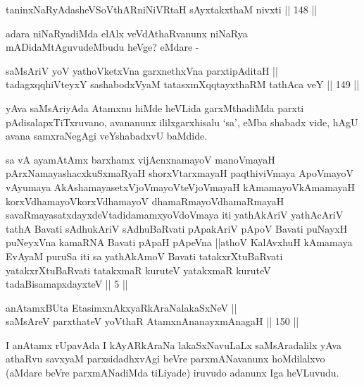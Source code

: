 \begin{shl}
taninxNaRyAdasheVSoV\s thAR\s niNiVRtaH sAyxtakxthaM nivxti \hfill || 148 ||  
\end{shl}

\begin{artha}
adara niNaRyadiMda elAlx veVdAthaRvanunx niNaRya mADidaMtAguvudeMbudu
heVge? eMdare -
\end{artha}

\begin{shl}
saMsAriV yoV yathoVketxVna garxnethxVna parxtipAditaH || \\
tadagxqqhiVteyxY sashabodxV\s yaM tatasxmXqqtayxthaRM tathAca veY \hfill || 149 ||  
\end{shl}

\begin{artha}
yAva saMsAriyAda Atamxnu hiMde heVLida garxMthadiMda parxti
pAdisalapxTiTxruvano, avananunx ililxgarxhisalu `sa', eMba shabadx
vide, hAgU avana samxraNegAgi veYshabadxvU baMdide.
\end{artha}

\begin{kandikeshl}
sa vA ayamAtAmx barxhamx vijAcnxnamayoV manoVmayaH pArxNamayashacxkuSxmaRyaH shorxVtarxmayaH paqthiviVmaya ApoVmayoV vAyumaya AkAshamayasetxVjoVmayoV\s teVjoVmayaH kAmamayoV\s kAmamayaH korxVdhamayoV\s korxVdhamayoV dhamaRmayoV\s dhamaRmayaH savaRmayasatxdayxdeVtadidamamxyoV\s doVmaya iti yathAkAriV yathAcAriV tathA Bavati sAdhukAriV sAdhuBaRvati pApakAriV pApoV Bavati puNayxH puNeyxVna kamaRNA Bavati pApaH pApeVna ||athoV KalAvxhuH kAmamaya EvAyaM puruSa iti sa yathAkAmoV Bavati tatakxrXtuBaRvati yatakxrXtuBaRvati tatakxmaR kuruteV yatakxmaR kuruteV tadaBisamapxdayxteV || 5 ||
\end{kandikeshl}

\begin{shl}
anAtamxBUta EtasimxnAkxyaRkAraNalakaSxNeV || \\
saMsAreV parxthateV yoV\s thaR AtamxnA\s nanayxmAnagaH \hfill || 150 ||  
\end{shl}

\begin{artha}
I anAtamx rUpavAda I kAyARkAraNa lakaSxNavuLaLx saMsAradalilx yAva
athaRvu savxyaM parxsidadhxvAgi beVre parxmANavanunx hoMdilalxvo
(aMdare beVre parxmANadiMda tiLiyade) iruvudo adanunx Iga heVLuvudu.
\end{artha}

